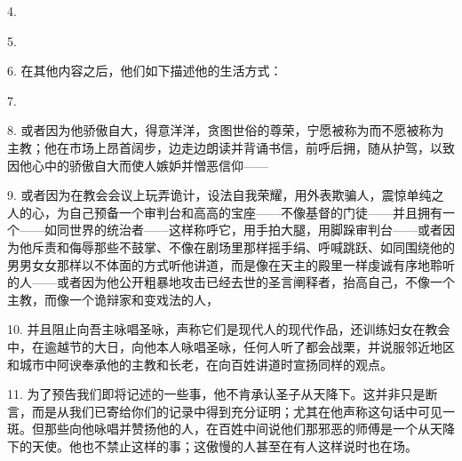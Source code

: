 4. \par

5. \par

6. 在其他内容之后，他们如下描述他的生活方式：\par

7. \par

8. 或者因为他骄傲自大，得意洋洋，贪图世俗的尊荣，宁愿被称为而不愿被称为主教；他在市场上昂首阔步，边走边朗读并背诵书信，前呼后拥，随从护驾，以致因他心中的骄傲自大而使人嫉妒并憎恶信仰——\par

9. 或者因为在教会会议上玩弄诡计，设法自我荣耀，用外表欺骗人，震惊单纯之人的心，为自己预备一个审判台和高高的宝座——不像基督的门徒——并且拥有一个——如同世界的统治者——这样称呼它，用手拍大腿，用脚跺审判台——或者因为他斥责和侮辱那些不鼓掌、不像在剧场里那样摇手绢、呼喊跳跃、如同围绕他的男男女女那样以不体面的方式听他讲道，而是像在天主的殿里一样虔诚有序地聆听的人——或者因为他公开粗暴地攻击已经去世的圣言阐释者，抬高自己，不像一个主教，而像一个诡辩家和变戏法的人，\par

10. 并且阻止向吾主咏唱圣咏，声称它们是现代人的现代作品，还训练妇女在教会中，在逾越节的大日，向他本人咏唱圣咏，任何人听了都会战栗，并说服邻近地区和城市中阿谀奉承他的主教和长老，在向百姓讲道时宣扬同样的观点。\par

11. 为了预告我们即将记述的一些事，他不肯承认圣子从天降下。这并非只是断言，而是从我们已寄给你们的记录中得到充分证明；尤其在他声称这句话中可见一斑。但那些向他咏唱并赞扬他的人，在百姓中间说他们那邪恶的师傅是一个从天降下的天使。他也不禁止这样的事；这傲慢的人甚至在有人这样说时也在场。\par

